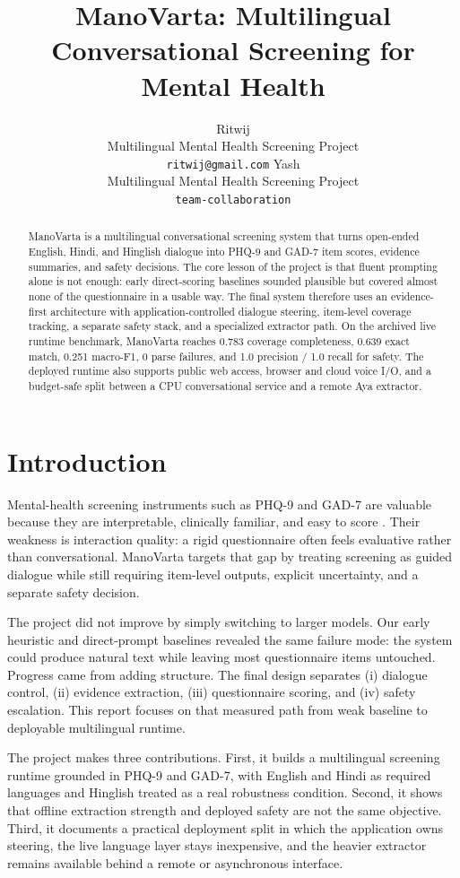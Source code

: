 \documentclass[11pt]{article}
\title{ManoVarta: Multilingual Conversational Screening for Mental Health}
\author{
  Ritwij \\
  Multilingual Mental Health Screening Project \\
  \texttt{ritwij@gmail.com}
  \And
  Yash \\
  Multilingual Mental Health Screening Project \\
  \texttt{team-collaboration}
}
\begin{document}
\maketitle

\begin{abstract}
ManoVarta is a multilingual conversational screening system that turns open-ended English, Hindi, and Hinglish dialogue into PHQ-9 and GAD-7 item scores, evidence summaries, and safety decisions. The core lesson of the project is that fluent prompting alone is not enough: early direct-scoring baselines sounded plausible but covered almost none of the questionnaire in a usable way. The final system therefore uses an evidence-first architecture with application-controlled dialogue steering, item-level coverage tracking, a separate safety stack, and a specialized extractor path. On the archived live runtime benchmark, ManoVarta reaches 0.783 coverage completeness, 0.639 exact match, 0.251 macro-F1, 0 parse failures, and 1.0 precision / 1.0 recall for safety. The deployed runtime also supports public web access, browser and cloud voice I/O, and a budget-safe split between a CPU conversational service and a remote Aya extractor.
\end{abstract}

\section{Introduction}
Mental-health screening instruments such as PHQ-9 and GAD-7 are valuable because they are interpretable, clinically familiar, and easy to score \citep{kroenke2001phq9,spitzer2006gad7}. Their weakness is interaction quality: a rigid questionnaire often feels evaluative rather than conversational. ManoVarta targets that gap by treating screening as guided dialogue while still requiring item-level outputs, explicit uncertainty, and a separate safety decision.

The project did not improve by simply switching to larger models. Our early heuristic and direct-prompt baselines revealed the same failure mode: the system could produce natural text while leaving most questionnaire items untouched. Progress came from adding structure. The final design separates (i) dialogue control, (ii) evidence extraction, (iii) questionnaire scoring, and (iv) safety escalation. This report focuses on that measured path from weak baseline to deployable multilingual runtime.

The project makes three contributions. First, it builds a multilingual screening runtime grounded in PHQ-9 and GAD-7, with English and Hindi as required languages and Hinglish treated as a real robustness condition. Second, it shows that offline extraction strength and deployed safety are not the same objective. Third, it documents a practical deployment split in which the application owns steering, the live language layer stays inexpensive, and the heavier extractor remains available behind a remote or asynchronous interface.
\end{document}
